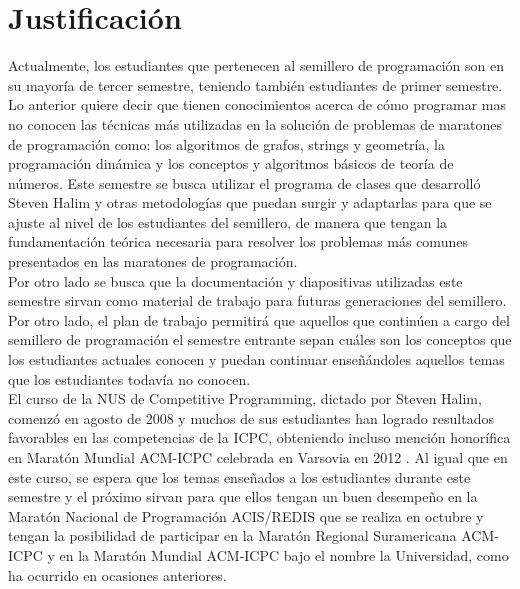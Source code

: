 \documentclass[11pt, oneside]{article}
\theoremstyle{definition}
\theoremstyle{remark}
\begin{document}
\section{Justificación}
Actualmente, los estudiantes que pertenecen al semillero de programación son en su mayoría de tercer semestre, teniendo también estudiantes de primer semestre. Lo anterior quiere decir que tienen conocimientos acerca de cómo programar mas no conocen las técnicas más utilizadas en la solución de problemas de maratones de programación como: los algoritmos de grafos, strings y geometría, la programación dinámica y los conceptos y algoritmos básicos de teoría de números. Este semestre se busca utilizar el programa de clases que desarrolló Steven Halim y otras metodologías que puedan surgir y adaptarlas para que se ajuste al nivel de los estudiantes del semillero, de manera que tengan la fundamentación teórica necesaria para resolver los problemas más comunes presentados en las maratones de programación.\\
Por otro lado se busca que la documentación y diapositivas utilizadas este semestre sirvan como material de trabajo para futuras generaciones del semillero. Por otro lado, el plan de trabajo permitirá que aquellos que continúen a cargo del semillero de programación el semestre entrante sepan cuáles son los conceptos que los estudiantes actuales conocen y puedan continuar enseñándoles aquellos temas que los estudiantes todavía no conocen.\\
El curso de la NUS de Competitive Programming, dictado por Steven Halim, comenzó en agosto de 2008 y muchos de sus estudiantes han logrado resultados favorables en las competencias de la ICPC, obteniendo incluso mención honorífica en Maratón Mundial ACM-ICPC celebrada en Varsovia en 2012 \cite{AlgoNUS}. Al igual que en este curso, se espera que los temas enseñados a los estudiantes durante este semestre y el próximo sirvan para que ellos tengan un buen desempeño en la Maratón Nacional de Programación ACIS/REDIS que se realiza en octubre y tengan la posibilidad de participar en la Maratón Regional Suramericana ACM-ICPC y en la Maratón Mundial ACM-ICPC bajo el nombre la Universidad, como ha ocurrido en ocasiones anteriores.
\end{document}
